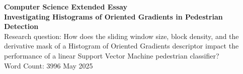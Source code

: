 \documentclass[a4paper, 12pt]{article}
\begin{document}

\begin{titlepage}
    \begin{center}
        \vspace*{1cm}
        \large{\textbf{Computer Science Extended Essay}}\\
        \vspace{3cm}
        \Large{\textbf{Investigating Histograms of Oriented Gradients in Pedestrian Detection}}\\
        \vspace{1.5cm}
        \large{Research question: How does the sliding window size, block density, and the derivative mask of a Histogram of Oriented Gradients descriptor impact the performance of a linear Support Vector Machine pedestrian classifier?}\\
        \vspace{3cm}
        \large{Word Count: 3996}
        \vfill
        \large{May 2025}
    \end{center}
\end{titlepage}




\begin{center}
\begin{spacing}{0.1}
\tableofcontents
\end{spacing}

\vspace{1in}
\end{center}
\newpage
{}











\newpage
\printbibliography[
heading=bibintoc,
]
\newpage

\end{document}
